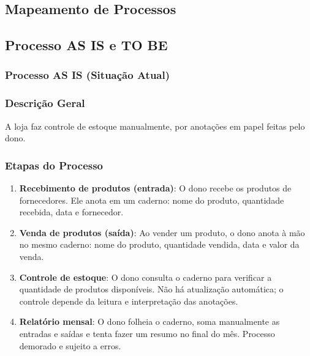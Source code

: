 \documentclass[
	12pt,				%
	openany,			%
	twoside,			%
	a4paper,			%
	english,			%
	brazil				%
	]{abntex2}
\begin{document}

\begin{apendicesenv}


\chapter{Mapeamento de Processos}
\section{Processo AS IS e TO BE}

\subsection{Processo AS IS (Situação Atual)}

\subsection*{Descrição Geral}
A loja faz controle de estoque manualmente, por anotações em papel feitas pelo dono.

\subsection*{Etapas do Processo}

\begin{enumerate}
    \item \textbf{Recebimento de produtos (entrada)}: O dono recebe os produtos de fornecedores. Ele anota em um caderno: nome do produto, quantidade recebida, data e fornecedor.
    
    \item \textbf{Venda de produtos (saída)}: Ao vender um produto, o dono anota à mão no mesmo caderno: nome do produto, quantidade vendida, data e valor da venda.
    
    \item \textbf{Controle de estoque}: O dono consulta o caderno para verificar a quantidade de produtos disponíveis. Não há atualização automática; o controle depende da leitura e interpretação das anotações.
    
    \item \textbf{Relatório mensal}: O dono folheia o caderno, soma manualmente as entradas e saídas e tenta fazer um resumo no final do mês. Processo demorado e sujeito a erros.
\end{enumerate}


\end{apendicesenv}
\end{document}
